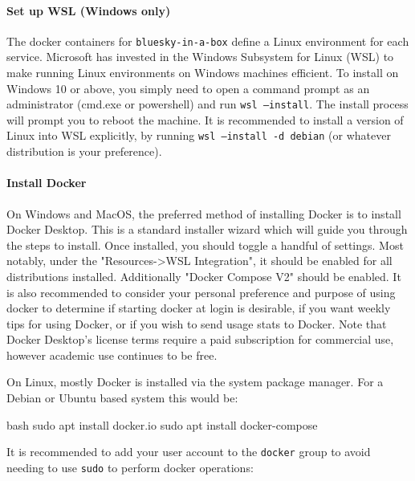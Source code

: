 \paragraph{Set up WSL (Windows only)}

The docker containers for \texttt{bluesky-in-a-box} define a Linux\cite{} environment for each service.
Microsoft has invested in the Windows Subsystem for Linux (WSL)\cite{} to make running Linux environments on Windows machines efficient.
To install on Windows 10 or above, you simply need to open a command prompt as an administrator (cmd.exe or powershell) and run \texttt{wsl --install}.
The install process will prompt you to reboot the machine.
It is recommended to install a version of Linux into WSL explicitly, by running \texttt{wsl --install -d debian} (or whatever distribution is your preference).

\paragraph{Install Docker}

On Windows and MacOS, the preferred method of installing Docker is to install Docker Desktop\cite{}.
This is a standard installer wizard which will guide you through the steps to install.
Once installed, you should toggle a handful of settings.
Most notably, under the "Resources->WSL Integration", it should be enabled for all distributions installed.
Additionally "Docker Compose V2" should be enabled.
It is also recommended to consider your personal preference and purpose of using docker to determine if starting docker at login is desirable, if you want weekly tips for using Docker, or if you wish to send usage stats to Docker.
Note that Docker Desktop's license terms require a paid subscription for commercial use, however academic use continues to be free.

On Linux, mostly Docker is installed via the system package manager.
For a Debian or Ubuntu based system this would be:

\begin{codefragment}{bash}
sudo apt install docker.io
sudo apt install docker-compose
\end{codefragment}

It is recommended to add your user account to the \texttt{docker} group to avoid needing to use \texttt{sudo} to perform docker operations:


